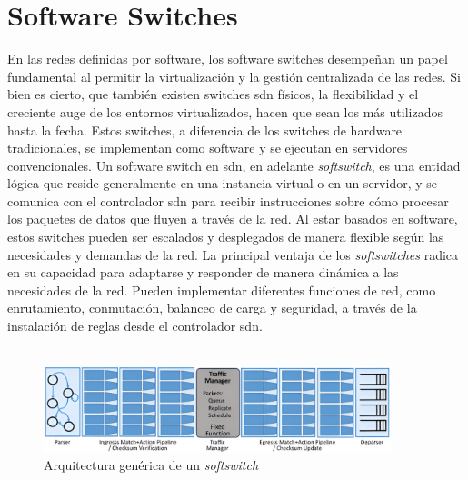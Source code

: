 \section{Software Switches }
\label{sec:softSwitchs}

En las redes definidas por software, los software switches desempeñan un papel fundamental al permitir la virtualización y la gestión centralizada de las redes. Si bien es cierto, que también existen switches \gls{sdn} físicos, la flexibilidad y el creciente auge de los entornos virtualizados, hacen que sean los más utilizados hasta la fecha. Estos switches, a diferencia de los switches de hardware tradicionales, se implementan como software y se ejecutan en servidores convencionales. Un software switch en \gls{sdn}, en adelante \textit{softswitch}, es una entidad lógica que reside generalmente en una instancia virtual o en un servidor, y se comunica con el controlador \gls{sdn} para recibir instrucciones sobre cómo procesar los paquetes de datos que fluyen a través de la red. Al estar basados en software, estos switches pueden ser escalados y desplegados de manera flexible según las necesidades y demandas de la red. La principal ventaja de los \textit{softswitches} radica en su capacidad para adaptarse y responder de manera dinámica a las necesidades de la red. Pueden implementar diferentes funciones de red, como enrutamiento, conmutación, balanceo de carga y seguridad, a través de la instalación de reglas desde el controlador \gls{sdn}. \\
\\
\begin{figure}[ht]
    \centering
    \includegraphics[width=0.9\textwidth]{archivos/img/teoria/softswitch.jpg}
    \caption{Arquitectura genérica de un \textit{softswitch}  \cite{softswitches1}}
    \label{fig:softswitch}
\end{figure}


